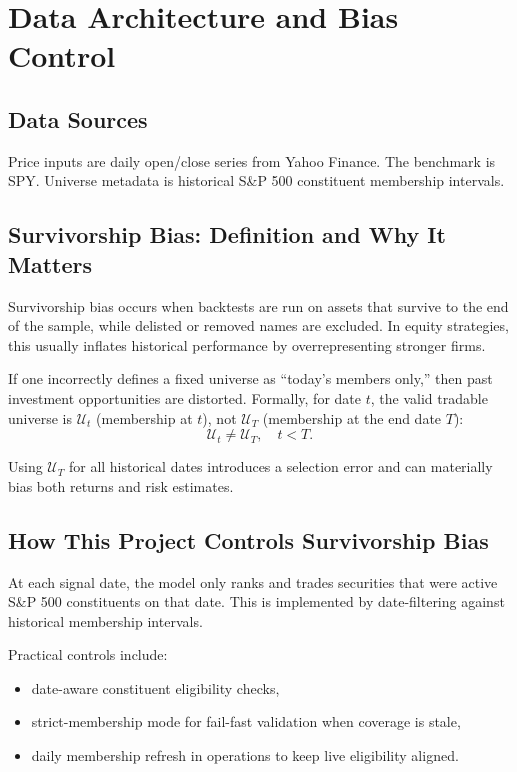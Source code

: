 \documentclass[11pt]{article}
\begin{document}
\section{Data Architecture and Bias Control}
\subsection{Data Sources}
Price inputs are daily open/close series from Yahoo Finance. The benchmark is SPY. Universe metadata is historical S\&P 500 constituent membership intervals.

\subsection{Survivorship Bias: Definition and Why It Matters}
Survivorship bias occurs when backtests are run on assets that survive to the end of the sample, while delisted or removed names are excluded. In equity strategies, this usually inflates historical performance by overrepresenting stronger firms.

If one incorrectly defines a fixed universe as ``today's members only,'' then past investment opportunities are distorted. Formally, for date $t$, the valid tradable universe is $\mathcal{U}_t$ (membership at $t$), not $\mathcal{U}_T$ (membership at the end date $T$):
\begin{equation}
\mathcal{U}_t \neq \mathcal{U}_T, \quad t<T.
\end{equation}

Using $\mathcal{U}_T$ for all historical dates introduces a selection error and can materially bias both returns and risk estimates.

\subsection{How This Project Controls Survivorship Bias}
At each signal date, the model only ranks and trades securities that were active S\&P 500 constituents on that date. This is implemented by date-filtering against historical membership intervals.

Practical controls include:
\begin{itemize}[leftmargin=1.5em]
    \item date-aware constituent eligibility checks,
    \item strict-membership mode for fail-fast validation when coverage is stale,
    \item daily membership refresh in operations to keep live eligibility aligned.
\end{itemize}
\end{document}
